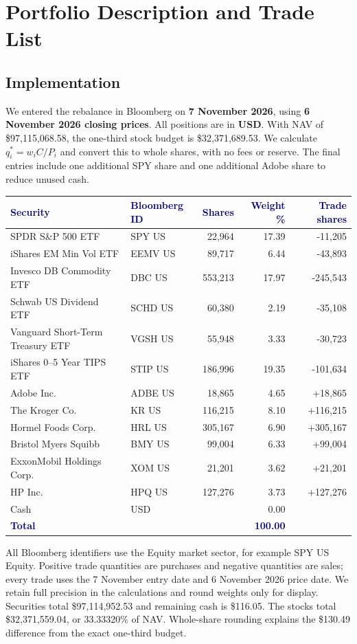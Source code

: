 \documentclass[10pt,a4paper]{article}
\newcommand{\hd}[1]{\textcolor{navy}{\textbf{#1}}}
\begin{document}
\section*{Portfolio Description and Trade List}
\label{sec:implementation}
\subsection*{Implementation}
We entered the rebalance in Bloomberg on \textbf{7 November 2026}, using \textbf{6 November 2026 closing prices}. All positions are in \textbf{USD}. With NAV of \$97,115,068.58, the one-third stock budget is \$32,371,689.53. We calculate $q_i^*=w_iC/P_i$ and convert this to whole shares, with no fees or reserve. The final entries include one additional SPY share and one additional Adobe share to reduce unused cash.

\begin{center}\footnotesize\setlength{\tabcolsep}{4pt}
\begin{tabularx}{\linewidth}{@{}X l r r r@{}}\toprule
\hd{Security}&\hd{Bloomberg ID}&\hd{Shares}&\hd{Weight \%}&\hd{Trade shares}\\\midrule
SPDR S\&P 500 ETF & SPY US & 22,964 & 17.39 & -11,205 \\
iShares EM Min Vol ETF & EEMV US & 89,717 & 6.44 & -43,893 \\
Invesco DB Commodity ETF & DBC US & 553,213 & 17.97 & -245,543 \\
Schwab US Dividend ETF & SCHD US & 60,380 & 2.19 & -35,108 \\
Vanguard Short-Term Treasury ETF & VGSH US & 55,948 & 3.33 & -30,723 \\
iShares 0--5 Year TIPS ETF & STIP US & 186,996 & 19.35 & -101,634 \\
Adobe Inc. & ADBE US & 18,865 & 4.65 & +18,865 \\
The Kroger Co. & KR US & 116,215 & 8.10 & +116,215 \\
Hormel Foods Corp. & HRL US & 305,167 & 6.90 & +305,167 \\
Bristol Myers Squibb & BMY US & 99,004 & 6.33 & +99,004 \\
ExxonMobil Holdings Corp. & XOM US & 21,201 & 3.62 & +21,201 \\
HP Inc. & HPQ US & 127,276 & 3.73 & +127,276 \\
\midrule Cash & USD & & 0.00 & \\
\hd{Total} & & & \hd{100.00} & \\\bottomrule
\end{tabularx}\end{center}
All Bloomberg identifiers use the Equity market sector, for example SPY US Equity. Positive trade quantities are purchases and negative quantities are sales; every trade uses the 7 November entry date and 6 November 2026 price date. We retain full precision in the calculations and round weights only for display. Securities total \$97,114,952.53 and remaining cash is \$116.05. The stocks total \$32,371,559.04, or 33.33320\% of NAV. Whole-share rounding explains the \$130.49 difference from the exact one-third budget.
\end{document}
